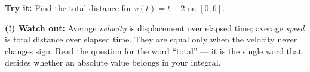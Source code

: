 \documentclass[12pt]{article}
\begin{document}
\begin{tryitbox}
\textbf{Try it:} Find the total distance for $v(t) = t - 2$ on
$[0, 6]$.\\[2pt]
\end{tryitbox}

\begin{watchoutbox}
\textbf{(!) Watch out:} Average \emph{velocity} is displacement over elapsed
time; average \emph{speed} is total distance over elapsed time. They are equal
only when the velocity never changes sign. Read the question for the word
``total'' --- it is the single word that decides whether an absolute value
belongs in your integral.
\end{watchoutbox}
\end{document}
